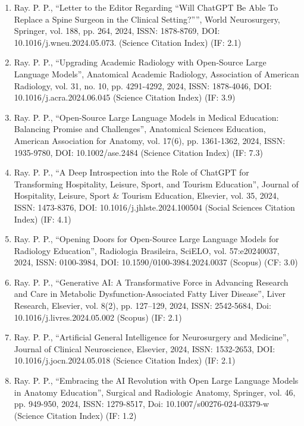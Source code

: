 \documentclass[11pt,a4paper]{moderncv}
\begin{document}
\begin{adjustwidth}{6em}{0pt}
\begin{enumerate}
		\item Ray. P. P., “Letter to the Editor Regarding “Will ChatGPT Be Able To Replace a Spine Surgeon in the Clinical Setting?””, World Neurosurgery, Springer, vol. 188, pp. 264, 2024, ISSN: 1878-8769, DOI: 10.1016/j.wneu.2024.05.073. (Science Citation Index) (IF: 2.1)
		
		\item Ray. P. P., “Upgrading Academic Radiology with Open-Source Large Language Models”, Anatomical Academic Radiology, Association of American Radiology, vol. 31, no. 10, pp. 4291-4292, 2024, ISSN: 1878-4046, DOI: 10.1016/j.acra.2024.06.045 (Science Citation Index) (IF: 3.9)
		
		\item Ray. P. P., “Open-Source Large Language Models in Medical Education: Balancing Promise and Challenges”, Anatomical Sciences Education, American Association for Anatomy, vol. 17(6), pp. 1361-1362, 2024, ISSN: 1935-9780, DOI: 10.1002/ase.2484 (Science Citation Index) (IF: 7.3)
		
		\item Ray. P. P., “A Deep Introspection into the Role of ChatGPT for Transforming Hospitality, Leisure, Sport, and Tourism Education”, Journal of Hospitality, Leisure, Sport \& Tourism Education, Elsevier, vol. 35, 2024, ISSN: 1473-8376, DOI: 10.1016/j.jhlste.2024.100504 (Social Sciences Citation Index) (IF: 4.1)
		
		\item Ray. P. P., “Opening Doors for Open-Source Large Language Models for Radiology Education”, Radiologia Brasileira, SciELO, vol. 57:e20240037, 2024, ISSN: 0100-3984, DOI: 10.1590/0100-3984.2024.0037 (Scopus) (CF: 3.0)
		
		\item Ray. P. P., “Generative AI: A Transformative Force in Advancing Research and Care in Metabolic Dysfunction-Associated Fatty Liver Disease”, Liver Research, Elsevier, vol. 8(2), pp. 127–129, 2024, ISSN: 2542-5684, Doi: 10.1016/j.livres.2024.05.002 (Scopus) (IF: 2.1)
		
		\item Ray. P. P., “Artificial General Intelligence for Neurosurgery and Medicine”, Journal of Clinical Neuroscience, Elsevier, 2024, ISSN: 1532-2653, DOI: 10.1016/j.jocn.2024.05.018 (Science Citation Index) (IF: 2.1)
		
		\item Ray. P. P., “Embracing the AI Revolution with Open Large Language Models in Anatomy Education”, Surgical and Radiologic Anatomy, Springer, vol. 46, pp. 949-950, 2024, ISSN: 1279-8517, Doi: 10.1007/s00276-024-03379-w (Science Citation Index) (IF: 1.2)
		

\end{enumerate}
\end{adjustwidth}
\end{document}
